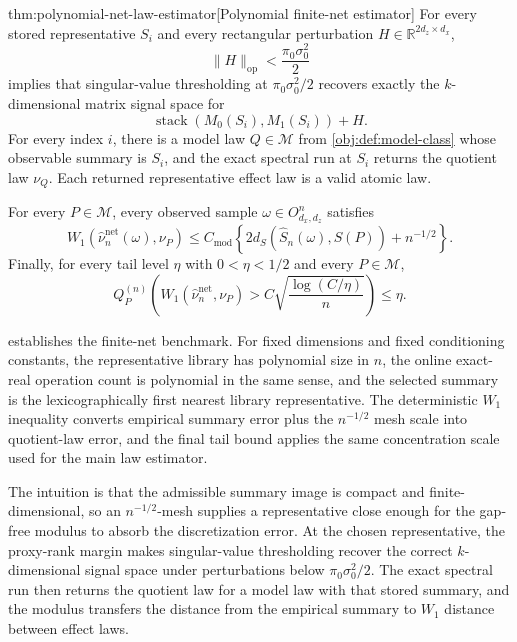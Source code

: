 \begin{theoremv}{thm:polynomial-net-law-estimator}[Polynomial finite-net estimator]
For every stored representative \(S_i\) and every rectangular perturbation \(H\in\mathbb R^{2d_z\times d_x}\),
\[
\|H\|_{\mathrm{op}}<\frac{\pi_0\sigma_0^2}{2}
\]
implies that singular-value thresholding at \(\pi_0\sigma_0^2/2\) recovers exactly the \(k\)-dimensional matrix signal space for
\[
\operatorname{stack}(M_0(S_i),M_1(S_i))+H.
\]
For every index \(i\), there is a model law \(Q\in\mathcal M\) from \cref{obj:def:model-class} whose observable summary is \(S_i\), and the exact spectral run at \(S_i\) returns the quotient law \(\nu_Q\). Each returned representative effect law is a valid atomic law.

For every \(P\in\mathcal M\), every observed sample \(\omega\in O_{d_x,d_z}^n\) satisfies
\[
W_1\!\left(\widehat\nu_n^{\mathrm{net}}(\omega),\nu_P\right)
\le
C_{\mathrm{mod}}\left\{2d_S(\widehat S_n(\omega),S(P))+n^{-1/2}\right\}.
\]
Finally, for every tail level \(\eta\) with \(0<\eta<1/2\) and every \(P\in\mathcal M\),
\[
Q_P^{(n)}\!\left(
W_1\!\left(\widehat\nu_n^{\mathrm{net}},\nu_P\right)
>
C\sqrt{\frac{\log(C/\eta)}{n}}
\right)
\le \eta .
\]
\end{theoremv}

 establishes the finite-net benchmark. For fixed dimensions and fixed conditioning constants, the representative library has polynomial size in \(n\), the online exact-real operation count is polynomial in the same sense, and the selected summary is the lexicographically first nearest library representative. The deterministic \(W_1\) inequality converts empirical summary error plus the \(n^{-1/2}\) mesh scale into quotient-law error, and the final tail bound applies the same concentration scale used for the main law estimator.

The intuition is that the admissible summary image is compact and finite-dimensional, so an \(n^{-1/2}\)-mesh supplies a representative close enough for the gap-free modulus to absorb the discretization error. At the chosen representative, the proxy-rank margin makes singular-value thresholding recover the correct \(k\)-dimensional signal space under perturbations below \(\pi_0\sigma_0^2/2\). The exact spectral run then returns the quotient law for a model law with that stored summary, and the modulus transfers the distance from the empirical summary to \(W_1\) distance between effect laws.

